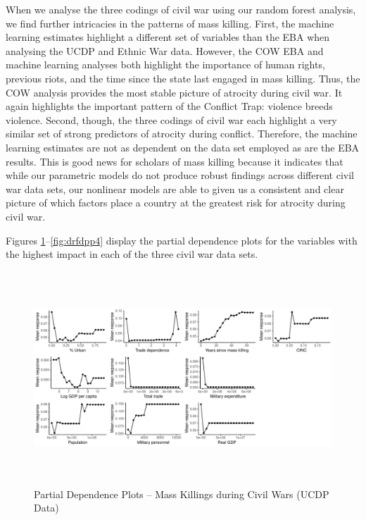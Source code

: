\documentclass[a4paper,12pt]{article}
\begin{document}
When we analyse the three codings of civil war using our random forest analysis, we find further intricacies in the patterns of mass killing. First, the machine learning estimates highlight a different set of variables than the EBA when analysing the UCDP and Ethnic War data. However, the COW EBA and machine learning analyses both highlight the importance of human rights, previous riots, and the time since the state last engaged in mass killing. Thus, the COW analysis provides the most stable picture of atrocity during civil war. It again highlights the important pattern of the Conflict Trap: violence breeds violence. Second, though, the three codings of civil war each highlight a very similar set of strong predictors of atrocity during conflict. Therefore, the machine learning estimates are not as dependent on the data set employed as are the EBA results. This is good news for scholars of mass killing because it indicates that while our parametric models do not produce robust findings across different civil war data sets, our nonlinear models are able to given us a consistent and clear picture of which factors place a country at the greatest risk for atrocity during civil war. 

Figures \ref{fig:drfdpp2}--\ref{fig:drfdpp4} display the partial dependence plots for the variables with the highest impact in each of the three civil war data sets.

\vspace{1cm}
	
\begin{figure}[H]
    \centering
    \includegraphics[width=\textwidth, height=8cm]{images/rf-ucdp-pd.pdf}
    \caption{Partial Dependence Plots -- Mass Killings during Civil Wars (UCDP Data)}
    \label{fig:drfdpp2}
\end{figure}
	
\end{document}
